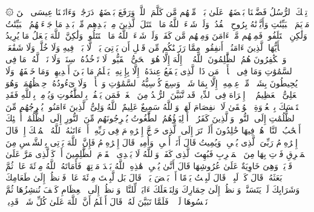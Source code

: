 \stopbuffer
\startbuffer[\q:2:253]
۞ تِلۡكَ ٱلرُّسُلُ فَضَّلۡنَا بَعۡضَهُمۡ عَلَىٰ بَعۡضࣲۘ مِّنۡهُم مَّن كَلَّمَ ٱللَّهُۖ وَرَفَعَ بَعۡضَهُمۡ دَرَجَٰتࣲۚ وَءَاتَیۡنَا عِیسَى ٱبۡنَ مَرۡیَمَ ٱلۡبَیِّنَٰتِ وَأَیَّدۡنَٰهُ بِرُوحِ ٱلۡقُدُسِۗ وَلَوۡ شَاۤءَ ٱللَّهُ مَا ٱقۡتَتَلَ ٱلَّذِینَ مِنۢ بَعۡدِهِم مِّنۢ بَعۡدِ مَا جَاۤءَتۡهُمُ ٱلۡبَیِّنَٰتُ وَلَٰكِنِ ٱخۡتَلَفُوا۟ فَمِنۡهُم مَّنۡ ءَامَنَ وَمِنۡهُم مَّن كَفَرَۚ وَلَوۡ شَاۤءَ ٱللَّهُ مَا ٱقۡتَتَلُوا۟ وَلَٰكِنَّ ٱللَّهَ یَفۡعَلُ مَا یُرِیدُ%
\stopbuffer
\startbuffer[\q:2:254]
یَٰۤأَیُّهَا ٱلَّذِینَ ءَامَنُوۤا۟ أَنفِقُوا۟ مِمَّا رَزَقۡنَٰكُم مِّن قَبۡلِ أَن یَأۡتِیَ یَوۡمࣱ لَّا بَیۡعࣱ فِیهِ وَلَا خُلَّةࣱ وَلَا شَفَٰعَةࣱۗ وَٱلۡكَٰفِرُونَ هُمُ ٱلظَّٰلِمُونَ%
\stopbuffer
\startbuffer[\q:2:255]
ٱللَّهُ لَاۤ إِلَٰهَ إِلَّا هُوَ ٱلۡحَیُّ ٱلۡقَیُّومُۚ لَا تَأۡخُذُهُۥ سِنَةࣱ وَلَا نَوۡمࣱۚ لَّهُۥ مَا فِی ٱلسَّمَٰوَٰتِ وَمَا فِی ٱلۡأَرۡضِۗ مَن ذَا ٱلَّذِی یَشۡفَعُ عِندَهُۥۤ إِلَّا بِإِذۡنِهِۦۚ یَعۡلَمُ مَا بَیۡنَ أَیۡدِیهِمۡ وَمَا خَلۡفَهُمۡۖ وَلَا یُحِیطُونَ بِشَیۡءࣲ مِّنۡ عِلۡمِهِۦۤ إِلَّا بِمَا شَاۤءَۚ وَسِعَ كُرۡسِیُّهُ ٱلسَّمَٰوَٰتِ وَٱلۡأَرۡضَۖ وَلَا یَءُودُهُۥ حِفۡظُهُمَاۚ وَهُوَ ٱلۡعَلِیُّ ٱلۡعَظِیمُ%
\stopbuffer
\startbuffer[\q:2:256]
لَاۤ إِكۡرَاهَ فِی ٱلدِّینِۖ قَد تَّبَیَّنَ ٱلرُّشۡدُ مِنَ ٱلۡغَیِّۚ فَمَن یَكۡفُرۡ بِٱلطَّٰغُوتِ وَیُؤۡمِنۢ بِٱللَّهِ فَقَدِ ٱسۡتَمۡسَكَ بِٱلۡعُرۡوَةِ ٱلۡوُثۡقَىٰ لَا ٱنفِصَامَ لَهَاۗ وَٱللَّهُ سَمِیعٌ عَلِیمٌ%
\stopbuffer
\startbuffer[\q:2:257]
ٱللَّهُ وَلِیُّ ٱلَّذِینَ ءَامَنُوا۟ یُخۡرِجُهُم مِّنَ ٱلظُّلُمَٰتِ إِلَى ٱلنُّورِۖ وَٱلَّذِینَ كَفَرُوۤا۟ أَوۡلِیَاۤؤُهُمُ ٱلطَّٰغُوتُ یُخۡرِجُونَهُم مِّنَ ٱلنُّورِ إِلَى ٱلظُّلُمَٰتِۗ أُو۟لَٰۤئِكَ أَصۡحَٰبُ ٱلنَّارِۖ هُمۡ فِیهَا خَٰلِدُونَ%
\stopbuffer
\startbuffer[\q:2:258]
أَلَمۡ تَرَ إِلَى ٱلَّذِی حَاۤجَّ إِبۡرَٰهِۦمَ فِی رَبِّهِۦۤ أَنۡ ءَاتَىٰهُ ٱللَّهُ ٱلۡمُلۡكَ إِذۡ قَالَ إِبۡرَٰهِۦمُ رَبِّیَ ٱلَّذِی یُحۡیِۦ وَیُمِیتُ قَالَ أَنَا۠ أُحۡیِۦ وَأُمِیتُۖ قَالَ إِبۡرَٰهِۦمُ فَإِنَّ ٱللَّهَ یَأۡتِی بِٱلشَّمۡسِ مِنَ ٱلۡمَشۡرِقِ فَأۡتِ بِهَا مِنَ ٱلۡمَغۡرِبِ فَبُهِتَ ٱلَّذِی كَفَرَۗ وَٱللَّهُ لَا یَهۡدِی ٱلۡقَوۡمَ ٱلظَّٰلِمِینَ%
\stopbuffer
\startbuffer[\q:2:259]
أَوۡ كَٱلَّذِی مَرَّ عَلَىٰ قَرۡیَةࣲ وَهِیَ خَاوِیَةٌ عَلَىٰ عُرُوشِهَا قَالَ أَنَّىٰ یُحۡیِۦ هَٰذِهِ ٱللَّهُ بَعۡدَ مَوۡتِهَاۖ فَأَمَاتَهُ ٱللَّهُ مِا۟ئَةَ عَامࣲ ثُمَّ بَعَثَهُۥۖ قَالَ كَمۡ لَبِثۡتَۖ قَالَ لَبِثۡتُ یَوۡمًا أَوۡ بَعۡضَ یَوۡمࣲۖ قَالَ بَل لَّبِثۡتَ مِا۟ئَةَ عَامࣲ فَٱنظُرۡ إِلَىٰ طَعَامِكَ وَشَرَابِكَ لَمۡ یَتَسَنَّهۡۖ وَٱنظُرۡ إِلَىٰ حِمَارِكَ وَلِنَجۡعَلَكَ ءَایَةࣰ لِّلنَّاسِۖ وَٱنظُرۡ إِلَى ٱلۡعِظَامِ كَیۡفَ نُنشِزُهَا ثُمَّ نَكۡسُوهَا لَحۡمࣰاۚ فَلَمَّا تَبَیَّنَ لَهُۥ قَالَ أَعۡلَمُ أَنَّ ٱللَّهَ عَلَىٰ كُلِّ شَیۡءࣲ قَدِیرࣱ%
